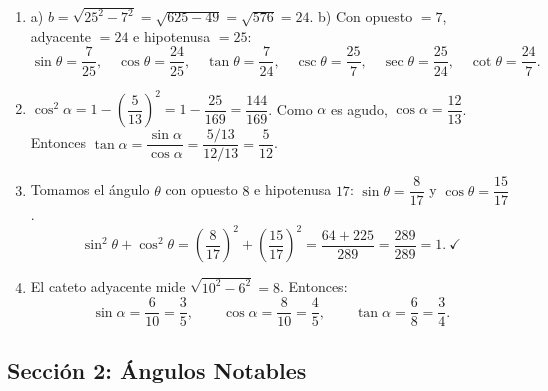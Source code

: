 \documentclass[12pt, letterpaper]{article}
\providecommand{\sen}{\sin}
\begin{document}
  \begin{enumerate}[leftmargin=*, label=\textbf{\arabic*.}]
    \item a) $b = \sqrt{25^2 - 7^2} = \sqrt{625 - 49} = \sqrt{576} = 24$.
          \quad b) Con opuesto $= 7$, adyacente $= 24$ e hipotenusa $= 25$:
          \[
            \sen \theta = \frac{7}{25}, \quad \cos \theta = \frac{24}{25}, \quad \tan \theta = \frac{7}{24}, \quad \csc \theta = \frac{25}{7}, \quad \sec \theta = \frac{25}{24}, \quad \cot \theta = \frac{24}{7}.
          \]

    \item $\cos^2 \alpha = 1 - \left(\dfrac{5}{13}\right)^2 = 1 - \dfrac{25}{169} = \dfrac{144}{169}$. Como $\alpha$ es agudo, $\cos \alpha = \dfrac{12}{13}$.
          Entonces $\tan \alpha = \dfrac{\sen \alpha}{\cos \alpha} = \dfrac{5/13}{12/13} = \dfrac{5}{12}$.

    \item Tomamos el ángulo $\theta$ con opuesto $8$ e hipotenusa $17$: $\sen \theta = \dfrac{8}{17}$ y $\cos \theta = \dfrac{15}{17}$.
          \[
            \sen^2 \theta + \cos^2 \theta = \left(\frac{8}{17}\right)^2 + \left(\frac{15}{17}\right)^2 = \frac{64 + 225}{289} = \frac{289}{289} = 1. \ \checkmark
          \]

    \item El cateto adyacente mide $\sqrt{10^2 - 6^2} = 8$. Entonces:
          \[
            \sen \alpha = \frac{6}{10} = \frac{3}{5}, \qquad \cos \alpha = \frac{8}{10} = \frac{4}{5}, \qquad \tan \alpha = \frac{6}{8} = \frac{3}{4}.
          \]
  \end{enumerate}

  \newpage

  \subsection*{Sección 2: Ángulos Notables}
\end{document}
